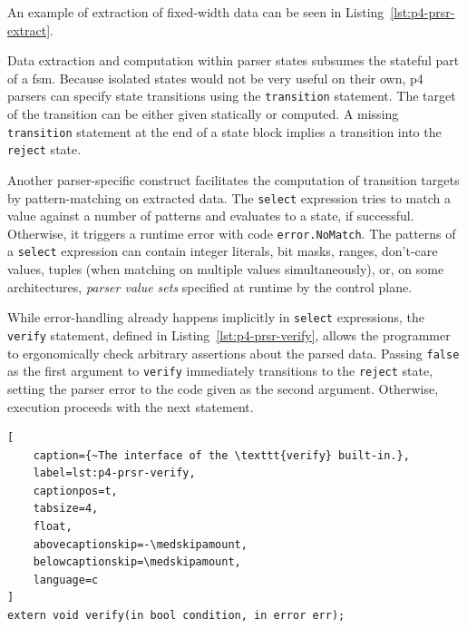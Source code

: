 An example of extraction of fixed-width data can be seen in
Listing~\ref{lst:p4-prsr-extract}.

Data extraction and computation within parser states subsumes the stateful part
of a \acrlong{fsm}. Because isolated states would not be very useful on their
own, \acrshort{p4} parsers can specify state transitions using the
\texttt{transition} statement. The target of the transition can be either given
statically or computed. A missing \texttt{transition} statement at the end of a
state block implies a transition into the \texttt{reject} state.

Another parser-specific construct facilitates the computation of transition
targets by pattern-matching on extracted data. The \texttt{select} expression
tries to match a value against a number of patterns and evaluates to a state, if
successful. Otherwise, it triggers a runtime error with code
\texttt{error.NoMatch}. The patterns of a \texttt{select} expression can contain
integer literals, bit masks, ranges, don't-care values, tuples (when matching on
multiple values simultaneously), or, on some architectures, \textit{parser value
sets} specified at runtime by the control plane.

While error-handling already happens implicitly in \texttt{select} expressions,
the \texttt{verify} statement, defined in Listing~\ref{lst:p4-prsr-verify},
allows the programmer to ergonomically check arbitrary assertions about the
parsed data. Passing \texttt{false} as the first argument to \texttt{verify}
immediately transitions to the \texttt{reject} state, setting the parser error
to the code given as the second argument. Otherwise, execution proceeds with the
next statement.

\begin{lstlisting}[
	caption={~The interface of the \texttt{verify} built-in.},
	label=lst:p4-prsr-verify,
	captionpos=t,
	tabsize=4,
	float,
	abovecaptionskip=-\medskipamount,
	belowcaptionskip=\medskipamount,
	language=c
]
extern void verify(in bool condition, in error err);
\end{lstlisting}

